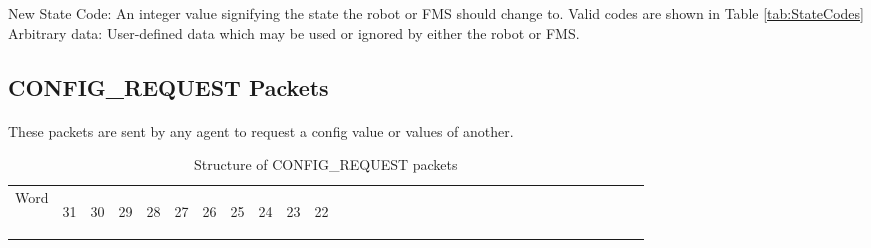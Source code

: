 \documentclass[11pt]{article}
\begin{document}
New State Code: An integer value signifying the state the robot or FMS should change to.
Valid codes are shown in Table \ref{tab:StateCodes}\\
Arbitrary data: User-defined data which may be used or ignored by either the robot or FMS.

\subsection {CONFIG\_REQUEST Packets}
\paragraph{}
These packets are sent by any agent to request a config value or values of another.
\newline
\begin{table}[h!]
    \centering
    \label{tab:configRequestDef}
    \caption{Structure of CONFIG\_REQUEST packets}
    \begin{tabular}{|p{1cm}|m{0.04cm}|m{0.04cm}|m{0.04cm}|m{0.04cm}|m{0.04cm}|m{0.04cm}|m{0.04cm}|m{0.04cm}|m{0.04cm}|
        m{0.04cm}|m{0.04cm}|m{0.04cm}|m{0.04cm}|m{0.04cm}|m{0.04cm}|m{0.04cm}|m{0.04cm}|m{0.04cm}|m{0.04cm}|m{0.04cm}|
        m{0.04cm}|m{0.04cm}|m{0.04cm}|m{0.04cm}|m{0.04cm}|m{0.04cm}|m{0.04cm}|m{0.04cm}|m{0.04cm}|m{0.04cm}|m{0.04cm}|m{0.04cm}|}
        \hline
        Word & 
        \begin{sideways}31\end{sideways} &
        \begin{sideways}30\end{sideways} & 
        \begin{sideways}29\end{sideways} &
        \begin{sideways}28\end{sideways} &
        \begin{sideways}27\end{sideways} &
        \begin{sideways}26\end{sideways} &
        \begin{sideways}25\end{sideways} &
        \begin{sideways}24\end{sideways} &
        \begin{sideways}23\end{sideways} &
        \begin{sideways}22\end{sideways} &

\end{tabular}
\end{table}
\end{document}
